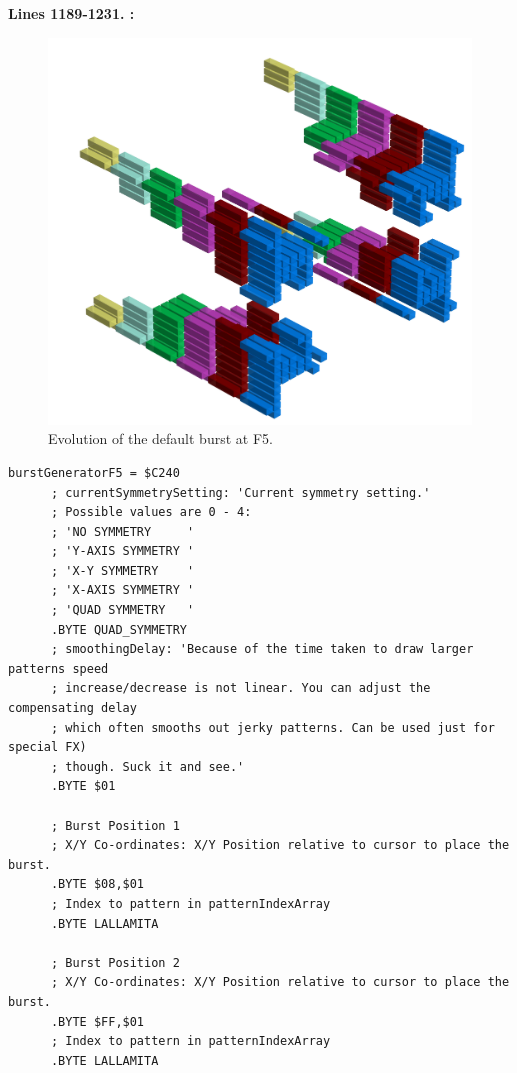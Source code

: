 \textbf{Lines 1189-1231. :} 
\clearpage

\clearpage
\begin{figure}[H]
    \centering
    \begin{adjustbox}{width=12cm,center}
      \includegraphics[width=12cm]{src/patterns/bursts/pattern2-45.png}%
    \end{adjustbox}
\caption{Evolution of the default burst at F5.}
\end{figure}
\clearpage

\begin{lstlisting}[caption=Source code for the F5 Burst.]
burstGeneratorF5 = $C240
      ; currentSymmetrySetting: 'Current symmetry setting.'
      ; Possible values are 0 - 4:
      ; 'NO SYMMETRY     '
      ; 'Y-AXIS SYMMETRY '
      ; 'X-Y SYMMETRY    '
      ; 'X-AXIS SYMMETRY '
      ; 'QUAD SYMMETRY   '
      .BYTE QUAD_SYMMETRY
      ; smoothingDelay: 'Because of the time taken to draw larger patterns speed
      ; increase/decrease is not linear. You can adjust the compensating delay
      ; which often smooths out jerky patterns. Can be used just for special FX)
      ; though. Suck it and see.'
      .BYTE $01

      ; Burst Position 1  
      ; X/Y Co-ordinates: X/Y Position relative to cursor to place the burst.
      .BYTE $08,$01
      ; Index to pattern in patternIndexArray
      .BYTE LALLAMITA

      ; Burst Position 2
      ; X/Y Co-ordinates: X/Y Position relative to cursor to place the burst.
      .BYTE $FF,$01
      ; Index to pattern in patternIndexArray
      .BYTE LALLAMITA

\end{lstlisting}

